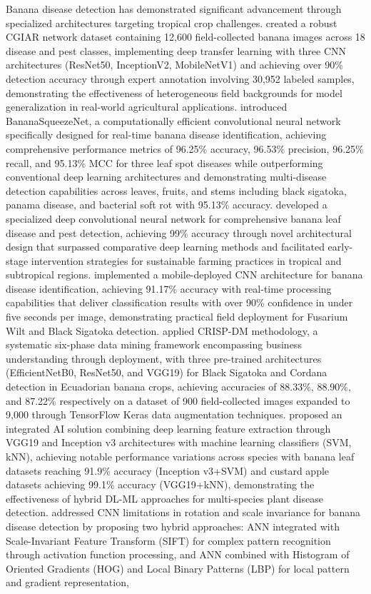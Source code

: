 \documentclass[sn-mathphys]{sn-jnl}
\theoremstyle{thmstyleone}%
\theoremstyle{thmstyletwo}%
\theoremstyle{thmstylethree}%
\begin{document}
Banana disease detection has demonstrated significant advancement through specialized architectures targeting tropical crop challenges. \citet{selvaraj2019ai} created a robust CGIAR network dataset containing 12,600 field-collected banana images across 18 disease and pest classes, implementing deep transfer learning with three CNN architectures (ResNet50, InceptionV2, MobileNetV1) and achieving over 90\% detection accuracy through expert annotation involving 30,952 labeled samples, demonstrating the effectiveness of heterogeneous field backgrounds for model generalization in real-world agricultural applications. \citet{bhuiyan2023bananasqueezenet} introduced BananaSqueezeNet, a computationally efficient convolutional neural network specifically designed for real-time banana disease identification, achieving comprehensive performance metrics of 96.25\% accuracy, 96.53\% precision, 96.25\% recall, and 95.13\% MCC for three leaf spot diseases while outperforming conventional deep learning architectures and demonstrating multi-disease detection capabilities across leaves, fruits, and stems including black sigatoka, panama disease, and bacterial soft rot with 95.13\% accuracy. \citet{rajalakshmi2025early} developed a specialized deep convolutional neural network for comprehensive banana leaf disease and pest detection, achieving 99\% accuracy through novel architectural design that surpassed comparative deep learning methods and facilitated early-stage intervention strategies for sustainable farming practices in tropical and subtropical regions. \citet{elinisa2024mobile} implemented a mobile-deployed CNN architecture for banana disease identification, achieving 91.17\% accuracy with real-time processing capabilities that deliver classification results with over 90\% confidence in under five seconds per image, demonstrating practical field deployment for Fusarium Wilt and Black Sigatoka detection. \citet{jimenez2025detection} applied CRISP-DM methodology, a systematic six-phase data mining framework encompassing business understanding through deployment, with three pre-trained architectures (EfficientNetB0, ResNet50, and VGG19) for Black Sigatoka and Cordana detection in Ecuadorian banana crops, achieving accuracies of 88.33\%, 88.90\%, and 87.22\% respectively on a dataset of 900 field-collected images expanded to 9,000 through TensorFlow Keras data augmentation techniques.\citet{sujatha2025advancing} proposed an integrated AI solution combining deep learning feature extraction through VGG19 and Inception v3 architectures with machine learning classifiers (SVM, kNN), achieving notable performance variations across species with banana leaf datasets reaching 91.9\% accuracy (Inception v3+SVM) and custard apple datasets achieving 99.1\% accuracy (VGG19+kNN), demonstrating the effectiveness of hybrid DL-ML approaches for multi-species plant disease detection. \citet{thiagarajan2024analysis} addressed CNN limitations in rotation and scale invariance for banana disease detection by proposing two hybrid approaches: ANN integrated with Scale-Invariant Feature Transform (SIFT) for complex pattern recognition through activation function processing, and ANN combined with Histogram of Oriented Gradients (HOG) and Local Binary Patterns (LBP) for local pattern and gradient representation, 
\end{document}
